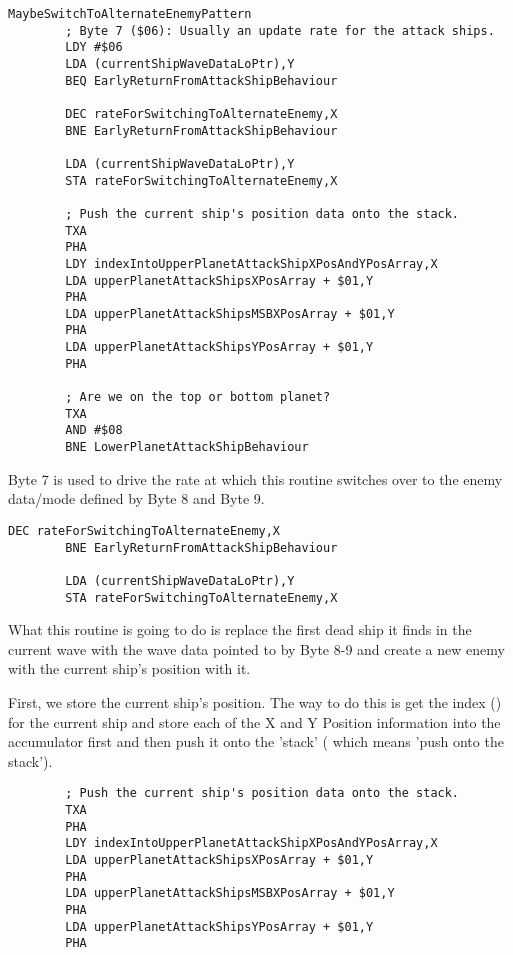 \begin{lstlisting}[caption=Byte 7 is used to periodically switch to an enemy mode defined by Bytes 8-9 ]
MaybeSwitchToAlternateEnemyPattern   
        ; Byte 7 ($06): Usually an update rate for the attack ships.
        LDY #$06
        LDA (currentShipWaveDataLoPtr),Y
        BEQ EarlyReturnFromAttackShipBehaviour

        DEC rateForSwitchingToAlternateEnemy,X
        BNE EarlyReturnFromAttackShipBehaviour

        LDA (currentShipWaveDataLoPtr),Y
        STA rateForSwitchingToAlternateEnemy,X

        ; Push the current ship's position data onto the stack.
        TXA
        PHA
        LDY indexIntoUpperPlanetAttackShipXPosAndYPosArray,X
        LDA upperPlanetAttackShipsXPosArray + $01,Y
        PHA
        LDA upperPlanetAttackShipsMSBXPosArray + $01,Y
        PHA
        LDA upperPlanetAttackShipsYPosArray + $01,Y
        PHA

        ; Are we on the top or bottom planet?
        TXA
        AND #$08
        BNE LowerPlanetAttackShipBehaviour

\end{lstlisting}

Byte 7 is used to drive the rate at which this routine switches over to the enemy data/mode defined by Byte 8 and Byte 9.

\begin{lstlisting}[caption=\icode{rateForSwitchingToAlternateEnemy} (Byte 7) is decremented and reloaded each time it reaches zero. ]
        DEC rateForSwitchingToAlternateEnemy,X
        BNE EarlyReturnFromAttackShipBehaviour

        LDA (currentShipWaveDataLoPtr),Y
        STA rateForSwitchingToAlternateEnemy,X
\end{lstlisting}

What this routine is going to do is replace the first dead ship it finds in the current wave with the wave data pointed to by  Byte 8-9
and create a new enemy with the current ship's position with it.

First, we store the current ship's position. The way to do this is get the index () for the current ship  and store
each of the X and Y Position information into the accumulator first  and then push it onto the 'stack' ( which means
'push  onto the stack').

\begin{lstlisting}
        ; Push the current ship's position data onto the stack.
        TXA
        PHA
        LDY indexIntoUpperPlanetAttackShipXPosAndYPosArray,X
        LDA upperPlanetAttackShipsXPosArray + $01,Y
        PHA
        LDA upperPlanetAttackShipsMSBXPosArray + $01,Y
        PHA
        LDA upperPlanetAttackShipsYPosArray + $01,Y
        PHA
\end{lstlisting}

